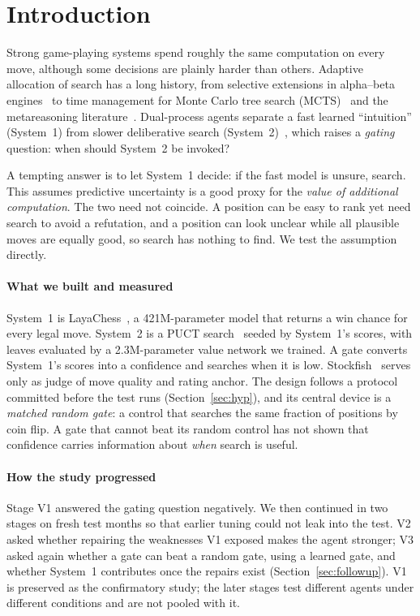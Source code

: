 \section{Introduction}
\label{sec:intro}
Strong game-playing systems spend roughly the same computation on every move, although some decisions are plainly harder than others. Adaptive allocation of search has a long history, from selective extensions in alpha--beta engines~\cite{knuth1975,campbell2002} to time management for Monte Carlo tree search (MCTS)~\cite{huang2010} and the metareasoning literature~\cite{russell1991,tolpin2012}. Dual-process agents separate a fast learned ``intuition'' (System~1) from slower deliberative search (System~2)~\cite{anthony2017,booch2021,kahneman2011,evans2013}, which raises a \emph{gating} question: when should System~2 be invoked?

A tempting answer is to let System~1 decide: if the fast model is unsure, search. This assumes predictive uncertainty is a good proxy for the \emph{value of additional computation}. The two need not coincide. A position can be easy to rank yet need search to avoid a refutation, and a position can look unclear while all plausible moves are equally good, so search has nothing to find. We test the assumption directly.

\paragraph*{What we built and measured}
System~1 is LayaChess~\cite{layachess}, a 421M-parameter model that returns a win chance for every legal move. System~2 is a PUCT search~\cite{kocsis2006,rosin2011,silver2017} seeded by System~1's scores, with leaves evaluated by a 2.3M-parameter value network we trained. A gate converts System~1's scores into a confidence and searches when it is low. Stockfish~\cite{stockfish} serves only as judge of move quality and rating anchor. The design follows a protocol committed before the test runs (Section~\ref{sec:hyp}), and its central device is a \emph{matched random gate}: a control that searches the same fraction of positions by coin flip. A gate that cannot beat its random control has not shown that confidence carries information about \emph{when} search is useful.

\paragraph*{How the study progressed}
Stage V1 answered the gating question negatively. We then continued in two stages on fresh test months so that earlier tuning could not leak into the test. V2 asked whether repairing the weaknesses V1 exposed makes the agent stronger; V3 asked again whether a gate can beat a random gate, using a learned gate, and whether System~1 contributes once the repairs exist (Section~\ref{sec:followup}). V1 is preserved as the confirmatory study; the later stages test different agents under different conditions and are not pooled with it.

